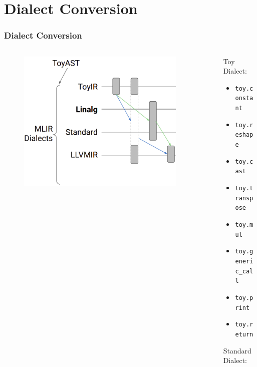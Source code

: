 \documentclass{beamer}
\begin{document}
\section{Dialect Conversion}
\begin{frame}
  \frametitle{Dialect Conversion}
  \begin{columns}
    \begin{column}{0.5\textwidth}
      \begin{figure}[h]
        \centering
        \includegraphics[width=0.9\textwidth]{pictures/DialectConversions.png}
      \end{figure}
    \end{column}
    \begin{column}{0.5\textwidth}
      {\scriptsize
        Toy Dialect: 
        \begin{itemize}
          \item \texttt{toy.constant}
          \item \texttt{toy.reshape}
          \item \texttt{toy.cast}
          \item \texttt{toy.transpose}
          \item \texttt{toy.mul}
          \item \texttt{toy.generic\_call}
          \item \texttt{toy.print}
          \item \texttt{toy.return}
        \end{itemize}
        \vspace{0.4cm}
        Standard Dialect:
        \begin{itemize}

\end{itemize}}
\end{column}
\end{columns}
\end{frame}
\end{document}
